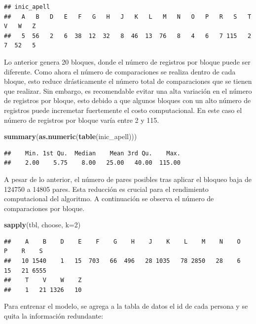 \documentclass[
  12pt,
]{book}
\newenvironment{Shaded}{\begin{snugshade}}{\end{snugshade}}
\newcommand{\AttributeTok}[1]{\textcolor[rgb]{0.13,0.29,0.53}{#1}}
\newcommand{\DecValTok}[1]{\textcolor[rgb]{0.00,0.00,0.81}{#1}}
\newcommand{\FunctionTok}[1]{\textcolor[rgb]{0.13,0.29,0.53}{\textbf{#1}}}
\newcommand{\NormalTok}[1]{#1}
\begin{document}
\begin{verbatim}
## inic_apell
##   A   B   D   E   F   G   H   J   K   L   M   N   O   P   R   S   T   V   W   Z 
##   5  56   2   6  38  12  32   8  46  13  76   8   4   6   7 115   2   7  52   5
\end{verbatim}

Lo anterior genera 20 bloques, donde el número de registros por bloque puede ser diferente. Como ahora el número de comparaciones se realiza dentro de cada bloque, esto reduce drásticamente el número total de comparaciones que se tienen que realizar. Sin embargo, es recomendable evitar una alta variación en el número de registros por bloque, esto debido a que algunos bloques con un alto número de registros puede incremetar fuertemente el costo computacional. En este caso el número de registros por bloque varía entre 2 y 115.

\begin{Shaded}
\begin{Highlighting}[]
\FunctionTok{summary}\NormalTok{(}\FunctionTok{as.numeric}\NormalTok{(}\FunctionTok{table}\NormalTok{(inic\_apell)))}
\end{Highlighting}
\end{Shaded}

\begin{verbatim}
##    Min. 1st Qu.  Median    Mean 3rd Qu.    Max. 
##    2.00    5.75    8.00   25.00   40.00  115.00
\end{verbatim}

A pesar de lo anterior, el número de pares posibles tras aplicar el bloqueo baja de 124750 a 14805 pares. Esta reducción es crucial para el rendimiento computacional del algoritmo. A continuación se observa el número de comparaciones por bloque.

\begin{Shaded}
\begin{Highlighting}[]
\FunctionTok{sapply}\NormalTok{(tbl, choose, }\AttributeTok{k=}\DecValTok{2}\NormalTok{)}
\end{Highlighting}
\end{Shaded}

\begin{verbatim}
##    A    B    D    E    F    G    H    J    K    L    M    N    O    P    R    S 
##   10 1540    1   15  703   66  496   28 1035   78 2850   28    6   15   21 6555 
##    T    V    W    Z 
##    1   21 1326   10
\end{verbatim}

Para entrenar el modelo, se agrega a la tabla de datos el id de cada persona y se quita la información redundante:
\end{document}
